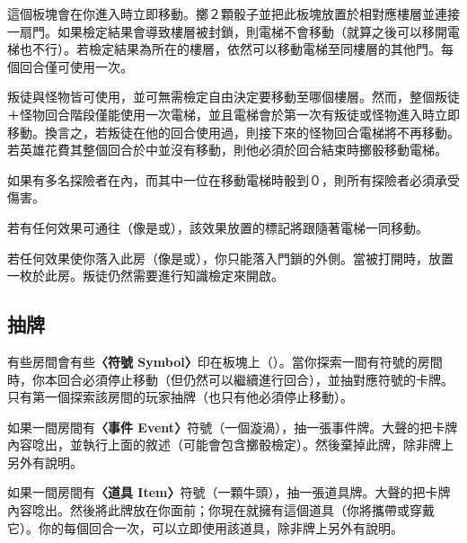 \begin{RuleBox}{}
  這個板塊會在你進入時立即移動。擲２顆骰子並把此板塊放置於相對應樓層並連接一扇門。如果檢定結果會導致樓層被封鎖，則電梯不會移動（就算之後可以移開電梯也不行）。若檢定結果為所在的樓層，依然可以移動電梯至同樓層的其他門。每個回合僅可使用一次。

  叛徒與怪物皆可使用，並可無需檢定自由決定要移動至哪個樓層。然而，整個叛徒＋怪物回合階段僅能使用一次電梯，並且電梯會於第一次有叛徒或怪物進入時立即移動。換言之，若叛徒在他的回合使用過，則接下來的怪物回合電梯將不再移動。若英雄花費其整個回合於中並沒有移動，則他必須於回合結束時擲骰移動電梯。

  如果有多名探險者在內，而其中一位在移動電梯時骰到０，則所有探險者必須承受傷害。

  若有任何效果可通往（像是或），該效果放置的標記將跟隨著電梯一同移動。
\end{RuleBox}

\begin{RuleBox}{}
  若任何效果使你落入此房（像是或），你只能落入門鎖的外側。當被打開時，放置一枚於此房。叛徒仍然需要進行知識檢定來開啟。
\end{RuleBox}


\subsection{抽牌} \label{ssec:draw-event-item-and-omen-cards}

有些房間會有些\textbf{〈符號 Symbol〉}印在板塊上（\EventSymbol{}\ItemSymbol{}\OmenSymbol{}）。當你探索一間有符號的房間時，你本回合必須停止移動（但仍然可以繼續進行回合），並抽對應符號的卡牌。只有第一個探索該房間的玩家抽牌（也只有他必須停止移動）。

如果一間房間有\textbf{〈事件 Event〉}符號（一個漩渦\EventSymbol{}），抽一張事件牌。大聲的把卡牌內容唸出，並執行上面的敘述（可能會包含擲骰檢定）。然後棄掉此牌，除非牌上另外有說明。

如果一間房間有\textbf{〈道具 Item〉}符號（一顆牛頭\ItemSymbol{}），抽一張道具牌。大聲的把卡牌內容唸出。然後將此牌放在你面前；你現在就擁有這個道具（你將攜帶或穿戴它）。你的每個回合一次，可以立即使用該道具，除非牌上另外有說明。

